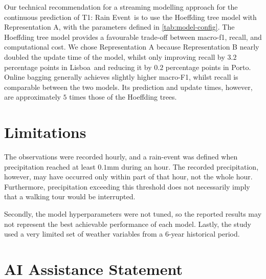 \documentclass[11pt,a4paper]{article}
\newcommand{\CityA}{Lisboa}
\newcommand{\CityB}{Porto}
\newcommand{\EventTarget}{T1: Rain Event}
\newif\ifdraftinstructions
\newcommand{\instruction}[1]{%
	\ifdraftinstructions
	\begin{instructionbox}[title=What to write here]
		\small\color{SecondaryText}#1
	\end{instructionbox}
	\fi
}
\begin{document}
	\begin{keybox}[title=Technical Recommendation]
		Our technical recommendation for a streaming modelling approach for the continuous prediction of \EventTarget\ is to use the Hoeffding tree model with Representation A, with the parameters defined in \autoref{tab:model-config}. The Hoeffding tree model provides a favourable trade-off between macro-f1, recall, and computational cost. We chose Representation A because Representation B nearly doubled the update time of the model, whilst only improving recall by $3.2$ percentage points in \CityA\ and reducing it by $0.2$ percentage points in \CityB. Online bagging generally achieves slightly higher macro-F1, whilst recall is comparable between the two models. Its prediction and update times, however, are approximately $5$ times those of the Hoeffding trees.
	\end{keybox}
	
	
	\section{Limitations}
	\instruction{Explain what the study cannot establish. Consider the limited set of weather variables, the selected historical period, the simplified binary event definition, external business factors not included in Open-Meteo, computational measurements being environment-specific, and any modelling assumptions. Do not introduce new results here.}
	
	The observations were recorded hourly, and a rain-event was defined when precipitation reached at least $0.1\mathrm{mm}$ during an hour. The recorded precipitation, however, may have occurred only within part of that hour, not the whole hour. Furthermore, precipitation exceeding this threshold does not necessarily imply that a walking tour would be interrupted.
	
	Secondly, the model hyperparameters were not tuned, so the reported results may not represent the best achievable performance of each model. Lastly, the study used a very limited set of weather variables from a 6-year historical period.
	
	\section{AI Assistance Statement}
	\instruction{This statement is mandatory. Adapt one of the formulations below truthfully. Delete the option that does not apply. Generative AI may assist with programming tasks, but it may not perform the interpretation of experimental results, discussion, business recommendation, technical recommendation, or evidence-based conclusions.}
	
\end{document}
